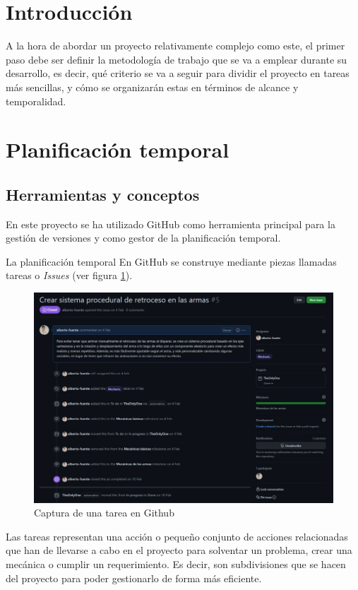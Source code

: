 
\section{Introducción}
A la hora de abordar un proyecto relativamente complejo como este, el primer paso debe ser definir la metodología de trabajo que se va a emplear durante su desarrollo, es decir, qué criterio se va a seguir para dividir el proyecto en tareas más sencillas, y cómo se organizarán estas en términos de alcance y temporalidad.
\section{Planificación temporal}
\subsection{Herramientas y conceptos}
En este proyecto se ha utilizado GitHub \cite{wiki:Github} como herramienta principal para la gestión de versiones y como gestor de la planificación temporal.

La planificación temporal En GitHub se construye mediante piezas llamadas tareas o \textit{Issues} (ver figura \ref{fig:TareasGithub}).
\begin{figure}[h]
	\centering
	\includegraphics[scale=0.45]{img/GithubScreenshot.jpg}
	\caption{Captura de una tarea en Github}
	\label{fig:TareasGithub}
    \end{figure}
Las tareas representan una acción o pequeño conjunto de acciones relacionadas que han de llevarse a cabo en el proyecto para solventar un problema, crear una mecánica o cumplir un requerimiento. Es decir, son subdivisiones que se hacen del proyecto para poder gestionarlo de forma más eficiente.

